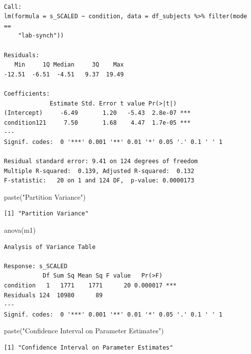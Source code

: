 \documentclass[
  letterpaper,
  DIV=11,
  numbers=noendperiod]{scrreprt}
\newenvironment{Shaded}{\begin{snugshade}}{\end{snugshade}}
\newcommand{\FunctionTok}[1]{\textcolor[rgb]{0.28,0.35,0.67}{#1}}
\newcommand{\NormalTok}[1]{\textcolor[rgb]{0.00,0.23,0.31}{#1}}
\newcommand{\StringTok}[1]{\textcolor[rgb]{0.13,0.47,0.30}{#1}}
\begin{document}
\begin{verbatim}

Call:
lm(formula = s_SCALED ~ condition, data = df_subjects %>% filter(mode == 
    "lab-synch"))

Residuals:
   Min     1Q Median     3Q    Max 
-12.51  -6.51  -4.51   9.37  19.49 

Coefficients:
             Estimate Std. Error t value Pr(>|t|)    
(Intercept)     -6.49       1.20   -5.43  2.8e-07 ***
condition121     7.50       1.68    4.47  1.7e-05 ***
---
Signif. codes:  0 '***' 0.001 '**' 0.01 '*' 0.05 '.' 0.1 ' ' 1

Residual standard error: 9.41 on 124 degrees of freedom
Multiple R-squared:  0.139, Adjusted R-squared:  0.132 
F-statistic:   20 on 1 and 124 DF,  p-value: 0.0000173
\end{verbatim}

\begin{Shaded}
\begin{Highlighting}[]
\FunctionTok{paste}\NormalTok{(}\StringTok{"Partition Variance"}\NormalTok{)}
\end{Highlighting}
\end{Shaded}

\begin{verbatim}
[1] "Partition Variance"
\end{verbatim}

\begin{Shaded}
\begin{Highlighting}[]
\FunctionTok{anova}\NormalTok{(m1)}
\end{Highlighting}
\end{Shaded}

\begin{verbatim}
Analysis of Variance Table

Response: s_SCALED
           Df Sum Sq Mean Sq F value   Pr(>F)    
condition   1   1771    1771      20 0.000017 ***
Residuals 124  10980      89                     
---
Signif. codes:  0 '***' 0.001 '**' 0.01 '*' 0.05 '.' 0.1 ' ' 1
\end{verbatim}

\begin{Shaded}
\begin{Highlighting}[]
\FunctionTok{paste}\NormalTok{(}\StringTok{"Confidence Interval on Parameter Estimates"}\NormalTok{)}
\end{Highlighting}
\end{Shaded}

\begin{verbatim}
[1] "Confidence Interval on Parameter Estimates"
\end{verbatim}
\end{document}
